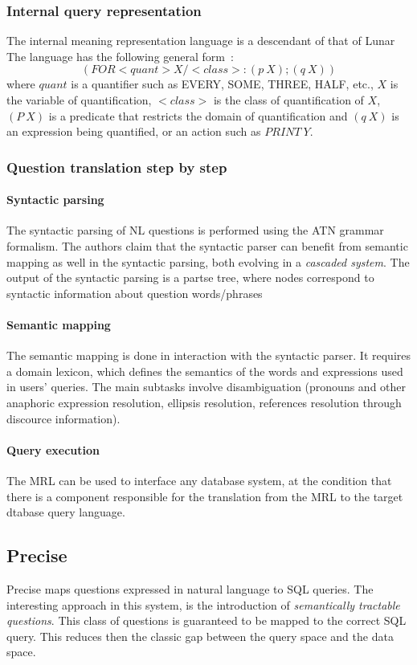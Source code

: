\documentclass[10pt,journal,letterpaper,compsoc]{IEEEtran}
\begin{document}
\subsubsection{Internal query representation}
The internal meaning representation language is a descendant of that of {\sc
Lunar}
The language has the following general form~\cite{Bates:1983:IRU:511793.511804}:
$$(FOR <quant> X / <class> : (p\ X) ; (q\ X)) $$
where $quant$ is a quantifier such as EVERY, SOME, THREE, HALF, etc., $X$ is the
variable of quantification, $<class>$ is the class of quantification of $X$,
$(P\ X)$ is a predicate that restricts the domain of quantification and $(q\ X)$
is an expression being quantified, or an action such as $PRINT\ Y$.


\subsubsection{Question translation step by step}
\paragraph{Syntactic parsing}
The syntactic parsing of NL questions is performed using the ATN
grammar formalism.
The authors claim that the syntactic parser can benefit from semantic mapping as
well in the syntactic parsing, both evolving in a {\it cascaded system}.
The output of the syntactic parsing is a partse tree, where nodes correspond to
syntactic information about question words/phrases

\paragraph{Semantic mapping}
The semantic mapping is done in interaction with the syntactic parser.
It requires a domain lexicon, which defines the semantics of the words and
expressions used in users' queries.
The main subtasks involve disambiguation (pronouns and other anaphoric
expression resolution, ellipsis resolution, references resolution through
discource information).

\paragraph{Query execution}
The MRL can be used to interface any database system, at the condition that
there is a component responsible for the translation from the MRL to the target
dtabase query language.


\subsection{{\sc Precise}~\cite{Popescu:2003:TTN:604045.604070,Popescu:2004:MNL:1220355.1220376}}
{\sc Precise} maps questions expressed in natural language to SQL queries.
The interesting approach in this system, is the introduction of {\it
semantically tractable questions}.
This class of questions is guaranteed to be mapped to the correct SQL query.
This reduces then the classic gap between the query space and the data space.
\end{document}
